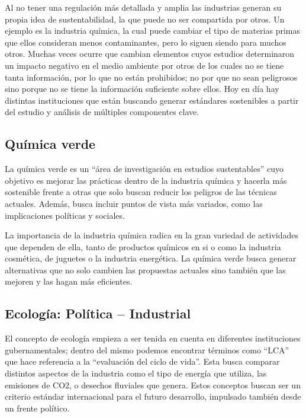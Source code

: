 \documentclass[runningheads]{llncs}
\begin{document}
\bigskip
Al no tener una regulación más detallada y amplia las industrias generan su propia idea de sustentabilidad, la que puede no ser compartida por otros. Un ejemplo es la industria química, la cual puede cambiar el tipo de materias primas que ellos consideran menos contaminantes, pero lo siguen siendo para muchos otros.  Muchas veces ocurre que cambian elementos cuyos estudios determinaron un impacto negativo en el medio ambiente por otros de los cuales no se tiene tanta información, por lo que no están prohibidos; no por que no sean peligrosos sino porque no se tiene la información suficiente sobre ellos.
Hoy en día hay distintas instituciones que están buscando generar estándares sostenibles a partir del estudio y análisis de múltiples componentes clave.

\subsection{Química verde}

\bigskip
La química verde es un “área de investigación en estudios sustentables” cuyo objetivo es mejorar las prácticas dentro de la industria química y hacerla más sostenible frente a otras que solo buscan reducir los peligros de las técnicas actuales. Además, busca incluir puntos de vista más variados, como las implicaciones políticas y sociales.

\bigskip
La importancia de la industria química radica en la gran variedad de actividades que dependen de ella, tanto de productos químicos en si o como la industria cosmética, de juguetes o la industria energética.
La química verde busca generar alternativas que no solo cambien las propuestas actuales sino también que las mejoren y las hagan más eficientes.

\subsection{Ecología: Política – Industrial}

\bigskip
El concepto de ecología empieza a ser tenida en cuenta en diferentes instituciones gubernamentales; dentro del mismo podemos encontrar términos como “LCA” que hace referencia a la “evaluación del ciclo de vida”.  Esta busca comparar distintos aspectos de la industria como el tipo de energía que utiliza, las emisiones de CO2, o desechos fluviales que genera. Estos conceptos buscan ser un criterio estándar internacional para el futuro desarrollo, impulsado también desde un frente político.
\end{document}
